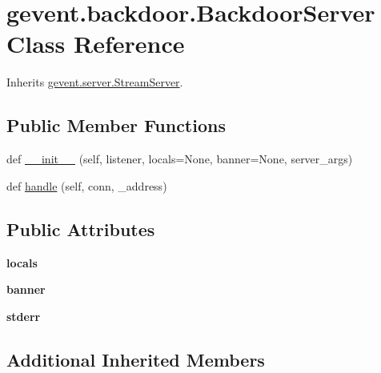 \hypertarget{classgevent_1_1backdoor_1_1_backdoor_server}{}\section{gevent.\+backdoor.\+Backdoor\+Server Class Reference}
\label{classgevent_1_1backdoor_1_1_backdoor_server}


Inherits \hyperlink{classgevent_1_1server_1_1_stream_server}{gevent.\+server.\+Stream\+Server}.

\subsection*{Public Member Functions}
\begin{DoxyCompactItemize}
\item 
def \hyperlink{classgevent_1_1backdoor_1_1_backdoor_server_a778e529c7d59e383ac383dd82b78b77a}{\+\_\+\+\_\+init\+\_\+\+\_\+} (self, listener, locals=None, banner=None, server\+\_\+args)
\item 
def \hyperlink{classgevent_1_1backdoor_1_1_backdoor_server_a1ca7d2ccfd6c400605ebb1e1038bcede}{handle} (self, conn, \+\_\+address)
\end{DoxyCompactItemize}
\subsection*{Public Attributes}
\begin{DoxyCompactItemize}
\item 
\mbox{\label{classgevent_1_1backdoor_1_1_backdoor_server_a4a6c393141a89810a585416845afa9d8}} 
{\bfseries locals}
\item 
\mbox{\label{classgevent_1_1backdoor_1_1_backdoor_server_a7a8532114e60b7bdf8d6baac08163234}} 
{\bfseries banner}
\item 
\mbox{\label{classgevent_1_1backdoor_1_1_backdoor_server_a9a716f5addbb46110ab7e0c961ea0dc1}} 
{\bfseries stderr}
\end{DoxyCompactItemize}
\subsection*{Additional Inherited Members}


